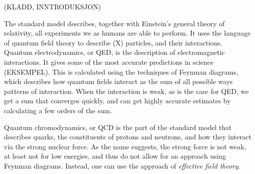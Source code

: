 (KLADD, INNTRODUKSJON)

The standard model describes, together with Einstein's general theory of relativity, all experiments we as humans are able to perform.
It uses the language of quantum field theory to describe (X) particles, and their interactions.
Quantum electrodynamics, or QED, is the description of electromagnetic interactions.
It gives some of the most accurate predictions in science (EKSEMPEL).
This is calculated using the techniques of Feynman diagrams, which describes how quantum fields interact as the sum of all possible ways patterns of interaction.
When the interaction is weak, as is the case for QED, we get a sum that converges quickly, and can get highly accurate estimates by calculating a few orders of the sum.

Quantum chromodynamics, or QCD is the part of the standard model that describes quarks, the constituents of protons and neutrons, and how they interact via the strong nuclear force.
As the name suggests, the strong force is not weak, at least not for low energies, and thus do not allow for an approach using Feynman diagrams.
Instead, one can use the approach of \emph{effective field theory}.

